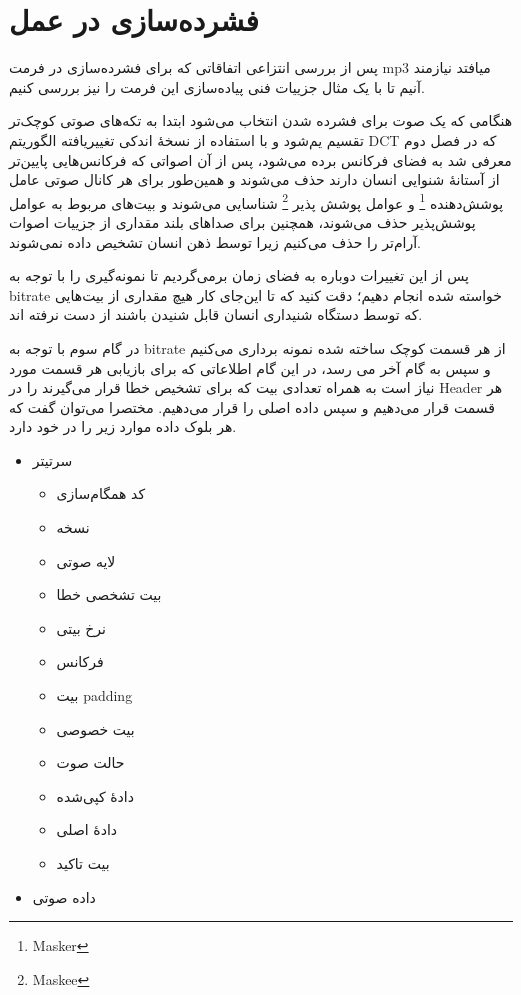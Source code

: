  \section{فشرده‌سازی  در عمل}

 پس از بررسی انتزاعی اتفاقاتی که برای فشرده‌سازی در فرمت mp3 میافتد نیازمند آنیم تا 
 با یک مثال جزییات فنی پیاده‌سازی این فرمت را نیز بررسی کنیم. 

 هنگامی که یک صوت برای فشرده‌ شدن انتخاب می‌شود ابتدا به تکه‌های صوتی کوچک‌تر تقسیم یم‌شود و با استفاده از نسخهٔ اندکی تغییریافته الگوریتم DCT که در فصل 
 دوم معرفی شد به فضای فرکانس برده می‌شود، پس از آن اصواتی که فرکانس‌هایی پایین‌تر از آستانهٔ شنوایی انسان دارند حذف می‌شوند و همین‌طور برای
 هر کانال صوتی عامل 
 پوشش‌دهنده \footnote{Masker}
 و عوامل پوشش پذیر \footnote{Maskee}
 شناسایی می‌شوند و بیت‌های مربوط به عوامل پوشش‌پذیر حذف می‌شوند، همچنین برای صداهای بلند مقداری از جزییات اصوات آرام‌تر را حذف می‌کنیم زیرا
 توسط ذهن انسان تشخیص داده نمی‌شوند. 

  پس از این تغییرات دوباره به فضای زمان برمی‌گردیم تا نمونه‌گیری را با توجه به 
 bitrate خواسته شده انجام دهیم؛ دقت کنید که تا این‌جای کار هیچ مقداری از بیت‌هایی که توسط دستگاه شنیداری انسان قابل شنیدن باشند از دست نرفته اند.

 در گام سوم با توجه به bitrate از هر قسمت کوچک ساخته شده نمونه برداری می‌کنیم و سپس به گام آخر می رسد،
 در این گام اطلاعاتی که برای بازیابی هر قسمت مورد نیاز است به همراه تعدادی بیت که برای تشخیص خطا قرار می‌گیرند را در Header
 هر قسمت قرار می‌دهیم و سپس داده اصلی را قرار می‌دهیم. مختصرا می‌توان گفت که هر بلوک داده موارد زیر را در خود دارد. 

 \begin{itemize}
         \item سرتیتر
         \begin{itemize}
                 \item کد همگام‌سازی
                 \item نسخه
                 \item لایه صوتی
                 \item بیت تشخصی خطا
                 \item نرخ بیتی
                 \item فرکانس
                 \item بیت padding
                 \item بیت خصوصی
                 \item حالت صوت
                 \item دادهٔ کپی‌شده
                 \item دادهٔ اصلی
                 \item بیت تاکید
         \end{itemize}
         \item داده صوتی
 \end{itemize}

